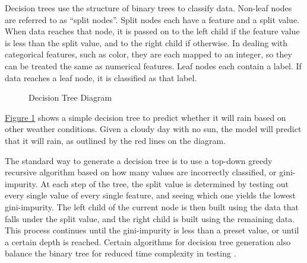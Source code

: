 \documentclass[12pt]{article}
\begin{document}
Decision trees use the structure of binary trees to classify data. Non-leaf nodes are referred to as ``split nodes''. Split nodes each have a feature and a split value. When data reaches that node, it is passed on to the left child if the feature value is less than the split value, and to the right child if otherwise. In dealing with categorical features, such as color, they are each mapped to an integer, so they can be treated the same as numerical features. Leaf nodes each contain a label. If data reaches a leaf node, it is classified as that label.

\begin{figure}[H]
    \centering
    \caption{Decision Tree Diagram}
    \label{fig:decisiontree}
\end{figure}

\hyperref[fig:decisiontree]{Figure 1} shows a simple decision tree to predict whether it will rain based on other weather conditions. Given a cloudy day with no sun, the model will predict that it will rain, as outlined by the red lines on the diagram.

The standard way to generate a decision tree is to use a top-down greedy recursive algorithm based on how many values are incorrectly classified, or gini-impurity. At each step of the tree, the split value is determined by testing out every single value of every single feature, and seeing which one yields the lowest gini-impurity. The left child of the current node is then built using the data that falls under the split value, and the right child is built using the remaining data. This process continues until the gini-impurity is less than a preset value, or until a certain depth is reached. Certain algorithms for decision tree generation also balance the binary tree for reduced time complexity in testing \cite{scikit-learn}.
\end{document}
